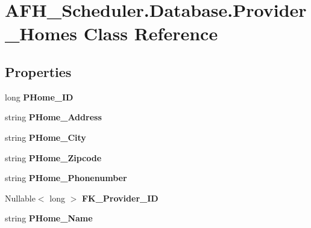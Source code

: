 \section{A\+F\+H\+\_\+\+Scheduler.\+Database.\+Provider\+\_\+\+Homes Class Reference}
\label{class_a_f_h___scheduler_1_1_database_1_1_provider___homes}
\subsection*{Properties}
\begin{DoxyCompactItemize}
\item 
\mbox{\label{class_a_f_h___scheduler_1_1_database_1_1_provider___homes_a3c42e1b0ba51e74f7c5d9d748d5c1e02}} 
long {\bfseries P\+Home\+\_\+\+ID}\hspace{0.3cm}{\ttfamily  [get, set]}
\item 
\mbox{\label{class_a_f_h___scheduler_1_1_database_1_1_provider___homes_a591b133ffd6c9542c54e727ef02491df}} 
string {\bfseries P\+Home\+\_\+\+Address}\hspace{0.3cm}{\ttfamily  [get, set]}
\item 
\mbox{\label{class_a_f_h___scheduler_1_1_database_1_1_provider___homes_a4682e18c64878222c0fb53fd1c63f13e}} 
string {\bfseries P\+Home\+\_\+\+City}\hspace{0.3cm}{\ttfamily  [get, set]}
\item 
\mbox{\label{class_a_f_h___scheduler_1_1_database_1_1_provider___homes_a86aa90d032b68e1e3318be284253b4ea}} 
string {\bfseries P\+Home\+\_\+\+Zipcode}\hspace{0.3cm}{\ttfamily  [get, set]}
\item 
\mbox{\label{class_a_f_h___scheduler_1_1_database_1_1_provider___homes_a8c6b334c742d9a003c28c3375cb92b63}} 
string {\bfseries P\+Home\+\_\+\+Phonenumber}\hspace{0.3cm}{\ttfamily  [get, set]}
\item 
\mbox{\label{class_a_f_h___scheduler_1_1_database_1_1_provider___homes_a52ddd2eab391e2edefb5ba75c87c18cb}} 
Nullable$<$ long $>$ {\bfseries F\+K\+\_\+\+Provider\+\_\+\+ID}\hspace{0.3cm}{\ttfamily  [get, set]}
\item 
\mbox{\label{class_a_f_h___scheduler_1_1_database_1_1_provider___homes_a0413a5c289cd3f91c2f7d1582c8eeec2}} 
string {\bfseries P\+Home\+\_\+\+Name}\hspace{0.3cm}{\ttfamily  [get, set]}
\item 

\end{DoxyCompactItemize}

